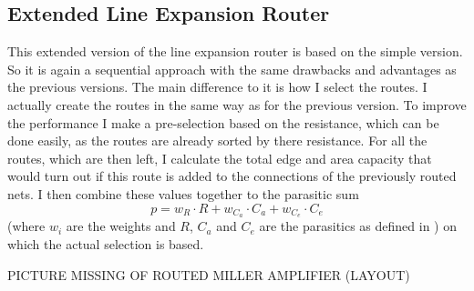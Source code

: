 \subsection{Extended Line Expansion Router}
This extended version of the line expansion router is based on the simple version. So it is again a sequential approach with the same drawbacks and advantages as the previous versions. The main difference to it is how I select the routes. I actually create the routes in the same way as for the previous version. To improve the performance I make a pre-selection based on the resistance, which can be done easily, as the routes are already sorted by there resistance. For all the routes, which are then left, I calculate the total edge and area capacity that would turn out if this route is added to the connections of the previously routed nets. I then combine these values together to the parasitic sum
\[p = w_R \cdot R + w_{C_a} \cdot C_a + w_{C_e} \cdot C_e\]
(where $w_i$ are the weights and $R$, $C_a$ and $C_e$ are the parasitics as defined in ) on which the actual selection is based.

PICTURE MISSING OF ROUTED MILLER AMPLIFIER (LAYOUT)
